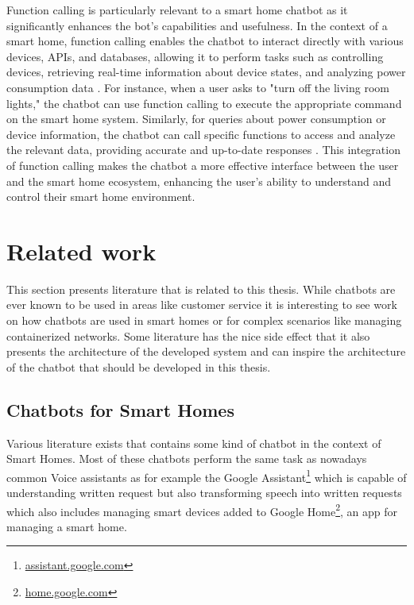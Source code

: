 Function calling is particularly relevant to a smart home chatbot as it significantly enhances the bot's capabilities and usefulness. In the context of a smart home, function calling enables the chatbot to interact directly with various devices, APIs, and databases, allowing it to perform tasks such as controlling devices, retrieving real-time information about device states, and analyzing power consumption data \cite{google2024function}. For instance, when a user asks to "turn off the living room lights," the chatbot can use function calling to execute the appropriate command on the smart home system. Similarly, for queries about power consumption or device information, the chatbot can call specific functions to access and analyze the relevant data, providing accurate and up-to-date responses \cite{mistral2024function, openai2024function-article}. This integration of function calling makes the chatbot a more effective interface between the user and the smart home ecosystem, enhancing the user's ability to understand and control their smart home environment.

\newpage
\section{Related work}
This section presents literature that is related to this thesis.
While chatbots are ever known to be used in areas like customer service it is interesting to see work on how chatbots are used in smart homes or for complex scenarios like managing containerized networks.
Some literature has the nice side effect that it also presents the architecture of the developed system and can inspire the architecture of the chatbot that should be developed in this thesis.

\subsection{Chatbots for Smart Homes}
Various literature exists that contains some kind of chatbot in the context of Smart Homes.
Most of these chatbots perform the same task as nowadays common Voice assistants as for example the Google Assistant\footnote{\href{https://assistant.google.com/}{assistant.google.com}} which is capable of understanding written request but also transforming speech into written requests which also includes managing smart devices added to Google Home\footnote{\href{https://home.google.com/intl/de_de/the-latest/}{home.google.com}}, an app for managing a smart home.

